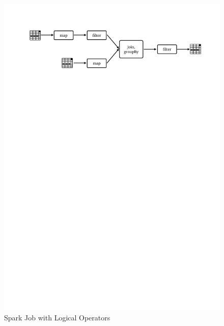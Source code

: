 \begin{figure}[!htbp]
    \centering
    \includegraphics[clip,trim=2.3cm 23.5cm 1.7cm 2.5cm]{stage-logical.pdf}
    \caption{Spark Job with Logical Operators}
    \label{fig:sp:logical}
\end{figure}
